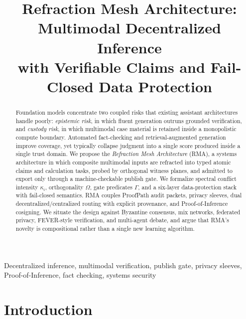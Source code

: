 \documentclass[journal,10pt,twocolumn,a4paper]{IEEEtran}
\begin{document}
\title{Refraction Mesh Architecture: Multimodal Decentralized Inference\\
with Verifiable Claims and Fail-Closed Data Protection}

\author{
}

\maketitle

\begin{abstract}
Foundation models concentrate two coupled risks that existing assistant architectures handle poorly: \emph{epistemic risk}, in which fluent generation outruns grounded verification, and \emph{custody risk}, in which multimodal case material is retained inside a monopolistic compute boundary.
Automated fact-checking and retrieval-augmented generation improve coverage, yet typically collapse judgment into a single score produced inside a single trust domain.
We propose the \emph{Refraction Mesh Architecture} (RMA), a systems architecture in which composite multimodal inputs are refracted into typed atomic claims and calculation tasks, probed by orthogonal witness planes, and admitted to export only through a machine-checkable publish gate.
We formalize spectral conflict intensity $\kappa_i$, orthogonality $\Omega$, gate predicates $\Gamma$, and a six-layer data-protection stack with fail-closed semantics.
RMA couples ProofPath audit packets, privacy sleeves, dual decentralized/centralized routing with explicit provenance, and Proof-of-Inference cosigning.
We situate the design against Byzantine consensus, mix networks, federated privacy, FEVER-style verification, and multi-agent debate, and argue that RMA's novelty is compositional rather than a single new learning algorithm.
\end{abstract}

\begin{IEEEkeywords}
Decentralized inference, multimodal verification, publish gate, privacy sleeves, Proof-of-Inference, fact checking, systems security
\end{IEEEkeywords}

\section{Introduction}
\label{sec:intro}
\end{document}
